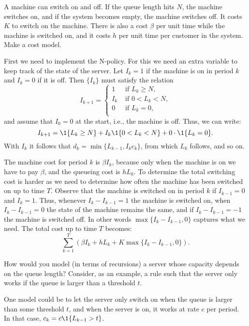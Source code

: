 \begin{extra}[ N-policies] A machine can switch on and off.
 If the queue length hits $N$, the machine switches on, and if the system becomes empty, the machine switches off.
 It costs $K$ to switch on the machine.
 There is also a cost $\beta$ per unit time while the machine is switched on, and it costs $h$ per unit time per customer in the system.
 Make a cost model.
\begin{solution}
 First we need to implement the N-policy. For this we need an extra
 variable to keep track of the state of the server. Let $I_k=1$ if the machine is on in period $k$ and $I_k=0$ if it is off. Then $\{I_k\}$ must satisfy the relation
 \begin{equation*}
 I_{k+1} =
 \begin{cases}
 1 & \text{ if } L_{k} \geq N,\\
 I_k & \text{ if } 0< L_{k} <N,\\
 0 & \text{ if } L_{k} =0,\\
 \end{cases}
 \end{equation*}
and assume that $I_0 =0$ at the start, i.e., the machine is off. Thus, we can write:
\begin{equation*}
 I_{k+1} = \1{L_k\geq N} + I_k \1{0<L_k<N} + 0\cdot \1{L_k = 0}.
\end{equation*}
With $I_k$ it follows that $d_k =\min\{L_{k-1}, I_k c_k\}$, from which
$L_k$ follows, and so on.

The machine cost for period $k$ is $\beta I_k$, because only when the
machine is on we have to pay $\beta$, and the queueing cost is
$h L_k$. To determine the total switching cost is harder as we need to
determine how often the machine has been switched on up to time
$T$. Observe that the machine is switched on in period $k$ if
$I_{k-1} = 0$ and $I_k=1$. Thus, whenever $I_k - I_{k-1}=1$ the
machine is switched on, when $I_k - I_{k-1}=0$ the state of the
machine remains the same, and if $I_k - I_{k-1} = -1$ the machine is
switched off. In other words $\max\{I_k - I_{k-1},0\}$ captures what
we need. The total cost up to time $T$ becomes:
\begin{equation*}
 \sum_{k=1}^T \left(\beta I_k + h L_k + K\max\{I_k - I_{k-1}, 0\}\right).
\end{equation*}
\end{solution}
\end{extra}




\begin{extra}
 How would you model (in terms of recursions) a server whose capacity
 depends on the queue length? Consider, as an example, a rule such
 that the server only works if the queue is larger than a threshold $t$. 
\begin{solution}
 One model could be to let the server only switch on when the queue
 is larger than some threshold $t$, and when the server is on, it
 works at rate $c$ per period. In that case,
 $c_k = c\1{L_{k-1} > t}$.
\end{solution}
\end{extra}

